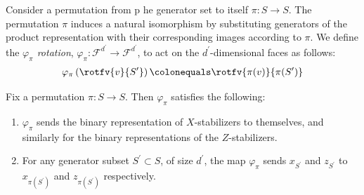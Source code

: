 \begin{definition}
Consider a permutation from p he generator set to itself $\pi \colon S \rightarrow S$. The permutation $\pi$ induces a natural isomorphism by substituting generators of the product representation with their corresponding images according to $\pi$. We define the \textit{$\varphi_{\pi}$ rotation}, $\varphi_{\pi} : \mathcal{F}^{d^{\prime}} \rightarrow \mathcal{F}^{d^{\prime}}$, to act on the $d^{\prime}$-dimensional faces as follows:
  \begin{equation*}
    \begin{split}
      \varphi_{\pi} \left(  \rotfv{v}{S^{\prime}}  \right) \colonequals \rotfv{\pi(v)}{\pi(S^{\prime})}
    \end{split}
  \end{equation*}
\end{definition}
\begin{claim}
  \label{claim:permuaction}
  Fix a permutation $\pi : S \rightarrow S$. Then $\varphi_{\pi}$ satisfies the following:
  \begin{enumerate}
    \item $\varphi_{\pi}$ sends the binary representation of $X$-stabilizers to themselves, and similarly for the binary representations of the $Z$-stabilizers.
    \item For any generator subset $S^{\prime} \subset S$, of size $d^{\prime}$, the map $\varphi_{\pi}$ sends $x_{S^{\prime}}$ and $z_{S^{\prime}}$ to $x_{\pi(S^{\prime})}$ and $z_{\pi(S^{\prime})}$ respectively.
  \end{enumerate}
\end{claim}
